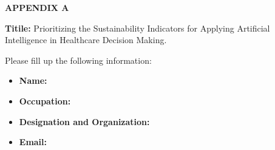 \clearpage
 \begingroup
	\begin{center}
		\textbf{{\Large\Large APPENDIX A}}
	\end{center}
 \label{APPENDIX A}


\textbf{Titile:} Prioritizing the Sustainability Indicators for Applying Artificial Intelligence in Healthcare Decision Making.



Please fill up the following information:
\begin{itemize}
    \item \textbf{Name:}
    \item \textbf{Occupation:}
    \item \textbf{Designation and Organization:}
    \item \textbf{Email:}
\end{itemize}

\lipsum[13-15]

\endinput
\endgroup 